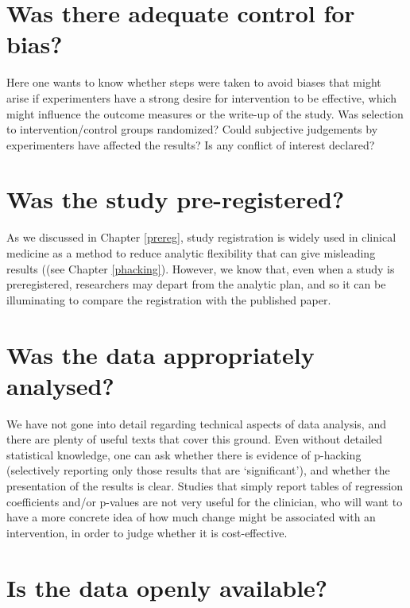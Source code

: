 \documentclass{krantz}
\begin{document}
\hypertarget{was-there-adequate-control-for-bias}{%
\section{Was there adequate control for bias?}\label{was-there-adequate-control-for-bias}}

Here one wants to know whether steps were taken to avoid biases that might arise if experimenters have a strong desire for intervention to be effective, which might influence the outcome measures or the write-up of the study. Was selection to intervention/control groups randomized? Could subjective judgements by experimenters have affected the results? Is any conflict of interest declared?

\hypertarget{was-the-study-pre-registered}{%
\section{Was the study pre-registered?}\label{was-the-study-pre-registered}}

As we discussed in Chapter \ref{prereg}, study registration is widely used in clinical medicine as a method to reduce analytic flexibility that can give misleading results ((see Chapter \ref{phacking}). However, we know that, even when a study is preregistered, researchers may depart from the analytic plan, and so it can be illuminating to compare the registration with the published paper.

\hypertarget{was-the-data-appropriately-analysed}{%
\section{Was the data appropriately analysed?}\label{was-the-data-appropriately-analysed}}

We have not gone into detail regarding technical aspects of data analysis, and there are plenty of useful texts that cover this ground. Even without detailed statistical knowledge, one can ask whether there is evidence of p-hacking (selectively reporting only those results that are `significant'), and whether the presentation of the results is clear. Studies that simply report tables of regression coefficients and/or p-values are not very useful for the clinician, who will want to have a more concrete idea of how much change might be associated with an intervention, in order to judge whether it is cost-effective.

\hypertarget{is-the-data-openly-available}{%
\section{Is the data openly available?}\label{is-the-data-openly-available}}
\end{document}
